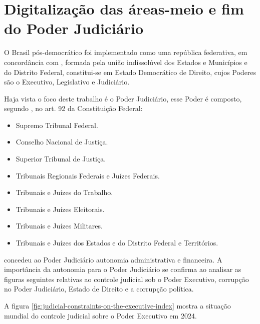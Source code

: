 \chapter{Digitalização das áreas-meio e fim do Poder Judiciário}

O Brasil pós-democrático foi implementado como uma república  federativa, em concordância com \cite{cf88}, formada pela união indissolúvel dos Estados e Municípios e do Distrito Federal, constitui-se em Estado Democrático de Direito, cujos Poderes são o Executivo, Legislativo e Judiciário.

Haja vista o foco deste trabalho é o Poder Judiciário, esse Poder é composto, segundo \cite{cf88}, no art. 92 da Constituição Federal:

\begin{itemize}
    \item Supremo Tribunal Federal.
    \item Conselho Nacional de Justiça.
    \item Superior Tribunal de Justiça.
    \item Tribunais Regionais Federais e Juízes Federais.
    \item Tribunais e Juízes do Trabalho.
    \item Tribunais e Juízes Eleitorais.
    \item Tribunais e Juízes Militares.
    \item  Tribunais e Juízes dos Estados e do Distrito Federal e Territórios.
\end{itemize}

\cite{cf88} concedeu ao Poder Judiciário autonomia administrativa e financeira. A importância da autonomia para o Poder Judiciário se confirma ao analisar as figuras seguintes relativas ao controle judicial sob o Poder Executivo,  corrupção no Poder Judiciário, Estado de Direito e a corrupção política.

A figura \ref{fig:judicial-constraints-on-the-executive-index} mostra a situação mundial do controle judicial sobre o Poder Executivo em 2024.

